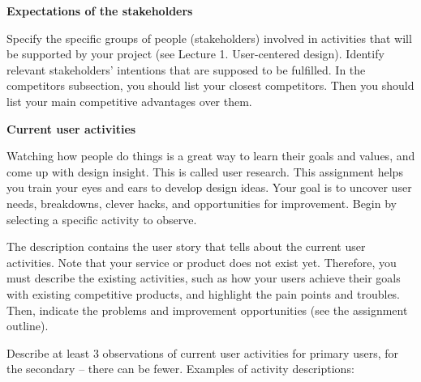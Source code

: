\documentclass[]{VUMIFTemplateClass}
\begin{document}
\textbf{Expectations of the stakeholders} \checkmark

Specify the specific groups of people (stakeholders) involved in activities that
will be supported by your project (see Lecture 1. User-centered design).
Identify relevant stakeholders' intentions that are supposed to be fulfilled. In
the competitors subsection, you should list your closest competitors. Then you
should list your main competitive advantages over them. \checkmark

\textbf{Current user activities}

Watching how people do things is a great way to learn their goals and values, and come up with design insight. This is called user research. This assignment helps you train your eyes and ears to develop design ideas. Your goal is to uncover user needs, breakdowns, clever hacks, and opportunities for improvement. Begin by selecting a specific activity to observe.

The description contains the user story that tells about the current user activities. Note that your service or product does not exist yet. Therefore, you must describe the existing activities, such as how your users achieve their goals with existing competitive products, and highlight the pain points and troubles. Then, indicate the problems and improvement opportunities (see the assignment outline).

Describe at least 3 observations of current user activities for primary users, for the secondary – there can be fewer. Examples of activity descriptions:
\end{document}
